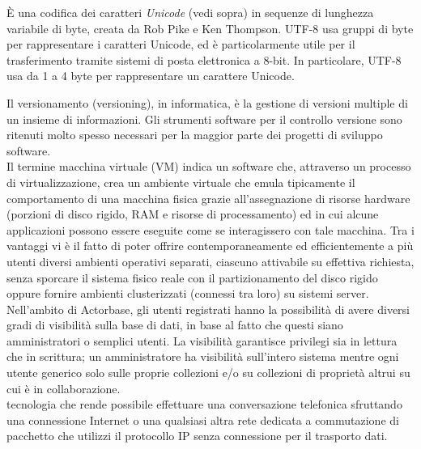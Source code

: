 \documentclass{scalatekids-article}
\begin{document}
   È una codifica dei caratteri \textit{Unicode} (vedi sopra) in sequenze di lunghezza variabile di byte, creata da Rob Pike e Ken Thompson. UTF-8 usa gruppi di byte per rappresentare i caratteri Unicode, ed è particolarmente utile per il trasferimento tramite sistemi di posta elettronica a 8-bit.
  In particolare, UTF-8 usa da 1 a 4 byte per rappresentare un carattere Unicode.
  \\


   Il versionamento (versioning), in informatica, è la gestione di versioni multiple di un insieme di informazioni.
  Gli strumenti software per il controllo versione sono ritenuti molto spesso necessari per la maggior parte dei progetti di sviluppo software.
  \\

   Il termine macchina virtuale (VM) indica un software che, attraverso un processo di virtualizzazione, crea un ambiente virtuale che emula tipicamente il comportamento di una macchina fisica grazie all'assegnazione di risorse hardware (porzioni di disco rigido, RAM e risorse di processamento) ed in cui alcune applicazioni possono essere eseguite come se interagissero con tale macchina.
  Tra i vantaggi vi è il fatto di poter offrire contemporaneamente ed efficientemente a più utenti diversi ambienti operativi separati, ciascuno attivabile su effettiva richiesta, senza sporcare il sistema fisico reale con il partizionamento del disco rigido oppure fornire ambienti clusterizzati (connessi tra loro) su sistemi server.
  \\
  
   Nell'ambito di Actorbase, gli utenti registrati hanno la possibilità di avere diversi gradi di visibilità sulla base di dati, in base al fatto che questi siano amministratori o semplici utenti.
  La visibilità garantisce privilegi sia in lettura che in scrittura; un amministratore ha visibilità sull'intero sistema mentre ogni utente generico solo sulle proprie collezioni e/o su collezioni di proprietà altrui su cui è in collaborazione.
  \\

   tecnologia che rende possibile effettuare una conversazione telefonica sfruttando una connessione Internet o una qualsiasi altra rete dedicata a commutazione di pacchetto che utilizzi il protocollo IP senza connessione per il trasporto dati.
  \\
\end{document}

